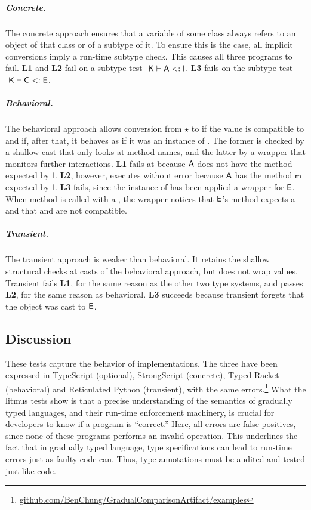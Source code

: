 \documentclass[a4paper,USenglish]{lipics-v2018}
\newcommand{\EM}[1]{\ensuremath{#1}\xspace}
\newcommand{\xt}[1]{{\sf{#1}}}
\newcommand{\EMxt}[1]{\EM{\xt{#1}}}
\newcommand{\m}{\EMxt m}
\newcommand{\K}{\EMxt K}
\newcommand{\A}{\EMxt {A}}
\newcommand{\I}{\EMxt {I}}
\newcommand{\E}{\EMxt {E}}
\newcommand{\any}{\EM{\star}}
\newcommand{\Sub}{\EM{<:}}
\newcommand{\StrSub}[4]{\EM{#1~#2\vdash #3\Sub #4}}
\newcounter{lem}
\begin{document}
\subparagraph*{Concrete.} The concrete approach ensures that a
variable of some class \C always refers to an object of that class or of a
subtype of it. To ensure this is the case, all implicit conversions imply a
run-time subtype check. This causes all three programs to fail. {\bf L1}
and {\bf L2} fail on a subtype test \StrSub{}\K\A\I. {\bf L3} fails on the
subtype test \StrSub{}\K\C\E.

\subparagraph*{Behavioral.} The behavioral approach allows
conversion from \any to \C if the value is compatible to \C and if,
after that, it behaves as if it was an instance of \C. The former is
checked by a shallow cast that only looks at method names, and the
latter by a wrapper that monitors further interactions. {\bf L1} fails at
because \A does not have the method \xt n expected by \I. {\bf L2}, however,
executes without error because \A has the method \m expected by \I. {\bf L3} fails, since the instance of \C has been applied
a wrapper for \E. When method \a is called with a \C, the wrapper notices
that \E's method \a expects a \D and that \C and \D are not compatible.

\subparagraph*{Transient.} The transient approach is weaker
than behavioral. It retains the shallow structural checks at casts of the
behavioral approach, but does not wrap values. Transient fails {\bf L1}, for
the same reason as the other two type systems, and passes {\bf L2}, for the
same reason as behavioral. {\bf L3} succeeds because transient forgets that
the \C object was cast to \E.

\subsection{Discussion}

These tests capture the behavior of implementations. The three have been
expressed in TypeScript (optional), StrongScript (concrete), Typed Racket
(behavioral) and Reticulated Python (transient), with the same
errors.\footnote{\url{github.com/BenChung/GradualComparisonArtifact/examples}}
What the litmus tests show is that a precise understanding of the semantics
of gradually typed languages, and their run-time enforcement machinery, is
crucial for developers to know if a program is ``correct.'' Here, all
errors are false positives, since none of these programs performs an invalid
operation. This underlines the fact that in gradually typed language, type
specifications can lead to run-time errors just as faulty code can. Thus,
type annotations must be audited and tested just like code.
\end{document}
